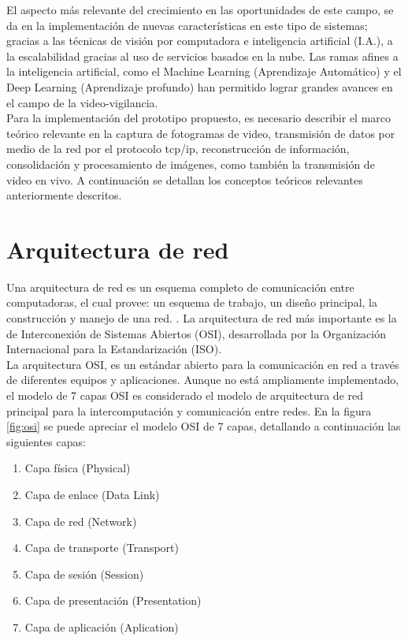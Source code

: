 El aspecto más relevante del crecimiento en las oportunidades de este campo, se da en la implementación de nuevas características en este tipo de sistemas; gracias a las técnicas de visión por computadora e inteligencia artificial (I.A.), a la escalabilidad gracias al uso de servicios basados en la nube. Las ramas afines a la inteligencia artificial, como el Machine Learning (Aprendizaje Automático) y el Deep Learning (Aprendizaje profundo) han permitido lograr grandes avances en el campo de la video-vigilancia.\\

Para la implementación del prototipo propuesto, es necesario describir el marco teórico relevante en la captura de fotogramas de video, transmisión de datos por medio de la red por el protocolo tcp/ip, reconstrucción de información, consolidación y procesamiento de imágenes, como también la transmisión de video en vivo. A continuación se detallan los conceptos teóricos relevantes anteriormente descritos.\\

\section{Arquitectura de red}
Una arquitectura de red es un esquema completo de comunicación entre computadoras, el cual provee: un esquema de trabajo, un diseño principal, la construcción y manejo de una red. \cite[1]{networkProtocolos:handbook}. La arquitectura de red más importante es la de Interconexión de Sistemas Abiertos (OSI), desarrollada por la Organización Internacional para la Estandarización (ISO).\\

La arquitectura OSI, es un estándar abierto para la comunicación en red a través de diferentes equipos y aplicaciones. Aunque no está ampliamente implementado, el modelo de 7 capas OSI es considerado el modelo de arquitectura de red principal para la intercomputación y comunicación entre redes. En la figura \ref{fig:osi} se puede apreciar el modelo OSI de 7 capas, detallando a continuación las siguientes capas:

\begin{enumerate}
    \item Capa física (Physical)
    \item Capa de enlace (Data Link)
    \item Capa de red (Network)
    \item Capa de transporte (Transport)
    \item Capa de sesión (Session)
    \item Capa de presentación (Presentation)
    \item Capa de aplicación (Aplication)
\end{enumerate}

